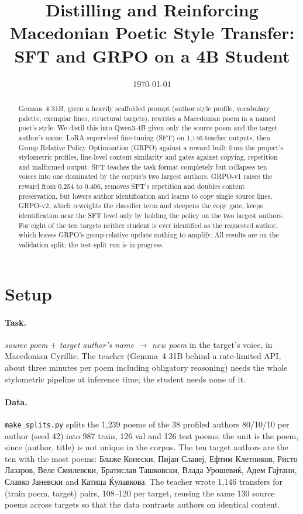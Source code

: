 \documentclass[11pt]{article}
\title{Distilling and Reinforcing Macedonian Poetic Style Transfer:\\
SFT and GRPO on a 4B Student}
\date{\today}
\begin{document}
\maketitle

\begin{abstract}
Gemma~4 31B, given a heavily scaffolded prompt (author style profile,
vocabulary palette, exemplar lines, structural targets), rewrites a Macedonian
poem in a named poet's style. We distil this into Qwen3-4B given only the
source poem and the target author's name: LoRA supervised fine-tuning (SFT) on
1{,}146 teacher outputs, then Group Relative Policy Optimization (GRPO) against
a reward built from the project's stylometric profiles, line-level content
similarity and gates against copying, repetition and malformed output. SFT
teaches the task format completely but collapses ten voices into one dominated
by the corpus's two largest authors. GRPO-v1 raises the reward from 0.254 to
0.406, removes SFT's repetition and doubles content preservation, but lowers
author identification and learns to copy single source lines. GRPO-v2, which
reweights the classifier term and steepens the copy gate, keeps identification
near the SFT level only by holding the policy on the two largest authors. For
eight of the ten targets neither student is ever identified as the requested
author, which leaves GRPO's group-relative update nothing to amplify. All
results are on the validation split; the test-split run is in progress.
\end{abstract}

\section{Setup}\label{sec:setup}

\paragraph{Task.} \emph{source poem} $+$ \emph{target author's name}
$\to$ \emph{new poem} in the target's voice, in Macedonian Cyrillic. The
teacher (Gemma~4 31B behind a rate-limited API, about three minutes per poem
including obligatory reasoning) needs the whole stylometric pipeline at
inference time; the student needs none of it.

\paragraph{Data.} \texttt{make\_splits.py} splits the 1{,}239 poems of the 38
profiled authors 80/10/10 per author (seed 42) into 987 train, 126 val and 126
test poems; the unit is the poem, since (author, title) is not unique in the
corpus. The ten target authors are the ten with the most poems: Блаже
Конески, Пијан Славеј, Ефтим Клетников, Ристо Лазаров, Веле Смилевски,
Братислав Ташковски, Влада Урошевиќ, Адем Гајтани, Славко Јаневски and
Катица Ќулавкова. The teacher wrote 1{,}146 transfers for (train poem,
target) pairs, 108--120 per target, reusing the same 130 source poems across
targets so that the data contrasts authors on identical content.
\end{document}
